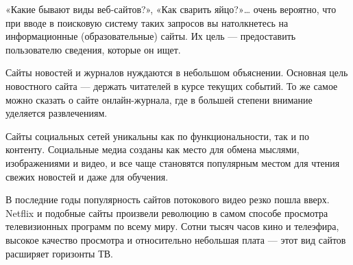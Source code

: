 «Какие бывают виды веб-сайтов?», «Как сварить яйцо?»… очень вероятно, что при вводе в поисковую систему таких запросов вы натолкнетесь на информационные (образовательные) сайты.
Их цель — предоставить пользователю сведения, которые он ищет.

Сайты новостей и журналов нуждаются в небольшом объяснении.
Основная цель новостного сайта — держать читателей в курсе текущих событий.
То же самое можно сказать о сайте онлайн-журнала, где в большей степени внимание уделяется развлечениям.

Сайты социальных сетей уникальны как по функциональности, так и по контенту.
Социальные медиа созданы как место для обмена мыслями, изображениями и видео, и все чаще становятся популярным местом для чтения свежих новостей и даже для обучения.

В последние годы популярность сайтов потокового видео резко пошла вверх.
Netflix и подобные сайты произвели революцию в самом способе просмотра телевизионных программ по всему миру.
Сотни тысяч часов кино и телеэфира, высокое качество просмотра и относительно небольшая плата — этот вид сайтов расширяет горизонты ТВ.

